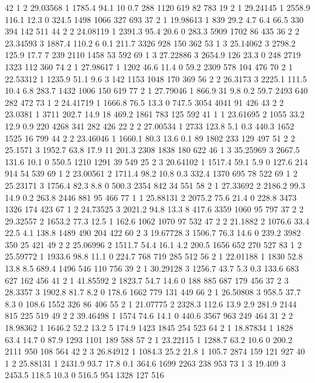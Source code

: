 42	1	2	29.03568	1	1785.4	94.1	10		0.7		288		1120	619		82		783
19	2	1	29.24145	1	2558.9	116.1	12.3	0		324.5	1498	1066	327		693
37	2	1	19.98613	1	839		29.2	4.7		6.4		66.5	330		394		142		511
44	2	2	24.08119	1	2391.3	95.4	20.6	0		283.3	5909	1702	86		435
36	2	2	23.34593	3	1887.4	110.2	6		0.1		211.7	3326	928		150		362
53	1	3	25.14062	3	2798.2	125.9	17.7	7		239		2110	1458	53		592
69	1	3	27.22886	3	2654.9	126		23.3	0		248		2719	1323	112		360
74	2	1	27.98617	1	1202	46.6	11.4	0		59.2	2309	578		104		476
70	2	1	22.53312	1	1235.9	51.1	9.6	3	142		1153	1048	170		369
56	2	2	26.3173	    3	2225.1	111.5	10.4	6.8		283.7	1432	1006	150		619
77	2	1	27.79046	1	866.9	31		9.8		0.2		59.7	2493	640		282		472
73	1	2	24.41719	1	1666.8	76.5	13.3	0		747.5	3054	4041	91		426
43	2	2	23.0381	    1	3711	202.7	14.9	18		469.2	1861	783		125		592
41	1	1	23.61695	2	1055	33.2	12.9	0.9		220		4268	341		282		426
22	2	2	27.00534	1	2733	123.8	5.1		0.3		440.3	1652	1525	16		799
44	2	2	23.46046	1	1660.1	80.3	13.6	0.1		89		1802	233		129		497
51	2	2	25.1571	    3	1952.7	63.8	17.9	11		201.3	2308	1838	180		622
46	1	3	35.25969	3	2667.5	131.6	10.1	0		550.5	1210	1291	39		549
25	2	3	20.64102	1	1517.4	59.1	5.9		0		127.6	214		914		54		539
69	1	2	23.00561	2	1711.4	98.2	10.8	0.3		332.4	1370	695		78		522
69	1	2	25.23171	3	1756.4	82.3	8.8		0		500.3	2354	842		34		551
58	2	1	27.33692	2	2186.2	99.3	14.9	0.2		263.8	2446	881		95		466
77	1	1	25.88131	2	2075.2	75.6	21.4	0		228.8	3473	1326	174		423
67	1	2	24.73525	3	2021.2	94.8	13.3	8		417.6	3359	1060	95		797
37	2	2	29.32557	2	1653.2	77.3	12.5	1		162.6	1062	1070	97		532
47	2	2	21.1882	    2	1076.6	33.4	22.5	4.1		138.8	1489	490		204		422
60	2	3	19.67728	3	1506.7	76.3	14.6	0		239.2	3982	350		25		421
49	2	2	25.06996	2	1511.7	54.4	16.1	4.2		200.5	1656	652		270		527
83	1	2	25.59772	1	1933.6	98.8	11.1	0		224.7	768		719		285		512
56	2	1	22.01188	1	1830	52.8	13.8	8.5		689.4	1496	546		110		756
39	2	1	30.29128	3	1256.7	43.7	5.3		0.3		133.6	683		627		162		456
41	2	1	41.85592	2	1823.7	54.7	14.6	0		188		885		687		179		456
37	2	3	28.3357	    3	1902.8	81.7	8.2		0		178.6	1662	779		131		449
66	2	1	26.50808	3	958.5	37.7	8.3		0		108.6	1552	326		86		406
55	2	1	21.07775	2	2328.3	112.6	13.9	2.9		281.9	2144	815		225		519
49	2	2	39.46498	1	1574	74.6	14.1	0		440.6	3567	963		249		464
31	2	2	18.98362	1	1646.2	52.2	13.2	5		174.9	1423	1845	254		523
64	2	1	18.87834	1	1828	63.4	14.7	0		87.9	1293	1101	189		588
57	2	1	23.22115	1	1288.7	63.2	10.6	0		200.2	2111	950		108		564
42	2	3	26.84912	1	1084.3	25.2	21.8	1		105.7	2874	159		121		927
40	1	2	25.88131	1	2431.9	93.7	17.8	0.1		364.6	1699	2263	238		953
73	1	3	19.409	    3	2453.5	118.5	10.3	0		516.5	954		1328	127		516
